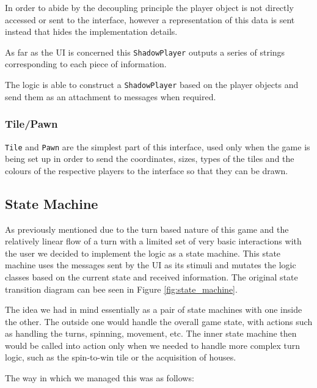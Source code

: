 \documentclass[a4paper, 11pt]{article}
\begin{document}
	In order to abide by the decoupling principle the player object is not directly accessed or sent to the interface, however a representation of this data is sent instead that hides the implementation details.
	
	As far as the UI is concerned this \texttt{ShadowPlayer} outputs a series of strings corresponding to each piece of information.
	
	The logic is able to construct a \texttt{ShadowPlayer} based on the player objects and send them as an attachment to messages when required.
	\subsubsection*{Tile/Pawn}
	\texttt{Tile} and \texttt{Pawn} are the simplest part of this interface, used only when the game is being set up in order to send the coordinates, sizes, types of the tiles and the colours of the respective players to the interface so that they can be drawn.
	
	\subsection*{State Machine}
	As previously mentioned due to the turn based nature of this game and the relatively linear flow of a turn with a limited set of very basic interactions with the user we decided to implement the logic as a state machine. This state machine uses the messages sent by the UI as its stimuli and mutates the logic classes based on the current state and received information. The original state transition diagram can bee seen in Figure \ref{fig:state_machine}.
	
	The idea we had in mind essentially as a pair of state machines with one inside the other. The outside one would handle the overall game state, with actions such as handling the turns, spinning, movement, etc. The inner state machine then would be called into action only when we needed to handle more complex turn logic, such as the spin-to-win tile or the acquisition of houses.
	
	The way in which we managed this was as follows:
	
\end{document}
